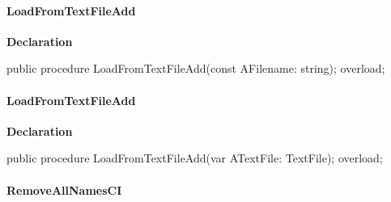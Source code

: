 \documentclass{report}
\newif\ifpdf
\begin{document}
\paragraph*{LoadFromTextFileAdd}\hspace*{\fill}

\label{PasDoc_StringVector.TStringVector-LoadFromTextFileAdd}
\begin{list}{}{
\setlength{\itemindent}{0cm}
\setlength{\listparindent}{0cm}
\setlength{\leftmargin}{\evensidemargin}
\addtolength{\leftmargin}{\tmplength}
\settowidth{\labelsep}{X}
\addtolength{\leftmargin}{\labelsep}
\setlength{\labelwidth}{\tmplength}
}
\item[\textbf{Declaration}\hfill]
\ifpdf
\begin{flushleft}
\fi
\begin{ttfamily}
public procedure LoadFromTextFileAdd(const AFilename: string); overload;\end{ttfamily}

\ifpdf
\end{flushleft}
\fi

\end{list}
\paragraph*{LoadFromTextFileAdd}\hspace*{\fill}

\label{PasDoc_StringVector.TStringVector-LoadFromTextFileAdd}
\begin{list}{}{
\setlength{\itemindent}{0cm}
\setlength{\listparindent}{0cm}
\setlength{\leftmargin}{\evensidemargin}
\addtolength{\leftmargin}{\tmplength}
\settowidth{\labelsep}{X}
\addtolength{\leftmargin}{\labelsep}
\setlength{\labelwidth}{\tmplength}
}
\item[\textbf{Declaration}\hfill]
\ifpdf
\begin{flushleft}
\fi
\begin{ttfamily}
public procedure LoadFromTextFileAdd(var ATextFile: TextFile); overload;\end{ttfamily}

\ifpdf
\end{flushleft}
\fi

\end{list}
\paragraph*{RemoveAllNamesCI}\hspace*{\fill}
\end{document}
